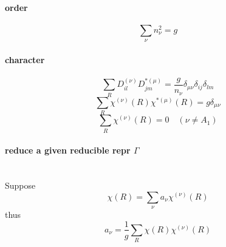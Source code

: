 \documentclass[a4paper]{article}
\numberwithin{equation}{section}
\begin{document}
\paragraph{order}
\begin{equation}\label{key}
\sum_\nu n_\nu^2 = g
\end{equation}
\paragraph{character}
\begin{equation}\label{key}
\sum_R D_{il}^{(\nu)} D_{jm}^{*(\mu)} = \dfrac{g}{n_\nu} \delta_{\mu\nu}\delta_{ij}\delta_{lm}
\end{equation}
\begin{equation}\label{key}
\sum_{R} \chi^{(\nu)}(R)\chi^{*(\mu)}(R) = g\delta_{\mu\nu}
\end{equation}
\begin{equation}\label{key}
\sum_R \chi^{(\nu)}(R) = 0 \quad (\nu \neq A_1)
\end{equation}
\paragraph{reduce a given reducible repr $ \Gamma $}~\\
Suppose
\begin{equation}\label{key}
\chi(R) = \sum_\nu a_\nu \chi^{(\nu)}(R)
\end{equation}
thus
\begin{equation}\label{key}
a_\nu = \dfrac{1}{g}\sum_R\chi(R)\chi^{(\nu)}(R)
\end{equation}
\end{document}
